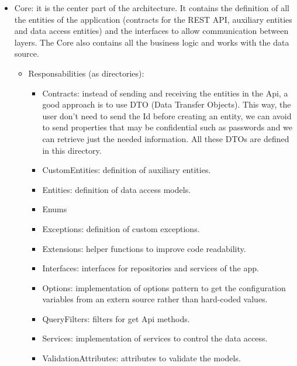 \begin{itemize}[noitemsep]
\begin{itemize}[noitemsep]
                    \end{itemize}
                \item Core: it is the center part of the architecture. 
                It contains the definition of all the entities of the application (contracts for the REST API, auxiliary entities and data access entities) and the 
                interfaces to allow communication between layers. 
                The Core also contains all the business logic and works with the data source.
                    \begin{itemize}[noitemsep] 
                        \item Responsabilities (as directories):
                            \begin{itemize}[noitemsep]
                                \item Contracts: instead of sending and receiving the entities in the Api, a good approach is to use DTO (Data Transfer Objects). This way, the user don't need to send the Id before creating an entity, we can avoid to send properties that may be confidential such as passwords and we can retrieve just the needed information. All these DTOs are defined in this directory.
                                \item CustomEntities: definition of auxiliary entities.
                                \item Entities: definition of data access models.
                                \item Enums
                                \item Exceptions: definition of custom exceptions.
                                \item Extensions: helper functions to improve code readability.
                                \item Interfaces: interfaces for repositories and services of the app.
                                \item Options: implementation of options pattern to get the configuration variables from an extern source rather than hard-coded values.
                                \item QueryFilters: filters for get Api methods.
                                \item Services: implementation of services to control the data access.
                                \item ValidationAttributes: attributes to validate the models.
                            \end{itemize}

\end{itemize}
\end{itemize}
